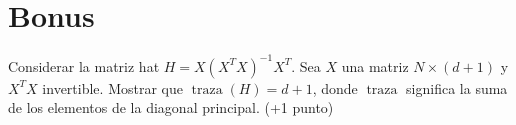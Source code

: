 \documentclass[a4paper, 11pt]{article}
\begin{document}
    \section{Bonus}

    \begin{bonus}
      Considerar la matriz hat $H = X(X^TX)^{-1}X^T$. Sea $X$ una matriz  $N \times (d+1)$ y $X^TX$ invertible. Mostrar que $\operatorname{traza}(H)=d+1$, donde $\operatorname{traza}$ significa la suma de los elementos de la diagonal principal. (+1 punto)
    \end{bonus}

    \nocite{*}



\end{document}
